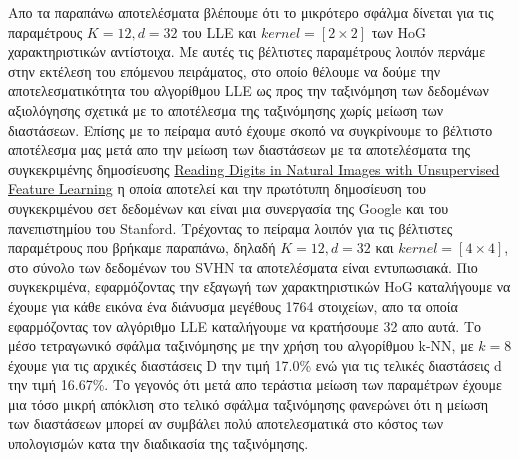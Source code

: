 \par
Απο τα παραπάνω αποτελέσματα βλέπουμε ότι το μικρότερο σφάλμα δίνεται για τις παραμέτρους $K=12, d=32$ του \textlatin{LLE} και $kernel=[2 \times 2]$ των \textlatin{HoG} χαρακτηριστικών αντίστοιχα. Με αυτές τις βέλτιστες παραμέτρους λοιπόν περνάμε στην εκτέλεση του επόμενου πειράματος, στο οποίο θέλουμε να δούμε την αποτελεσματικότητα του αλγορίθμου \textlatin{LLE} ως προς την ταξινόμηση των δεδομένων αξιολόγησης σχετικά με το αποτέλεσμα της ταξινόμησης χωρίς μείωση των διαστάσεων. Επίσης με το πείραμα αυτό έχουμε σκοπό να συγκρίνουμε το βέλτιστο αποτέλεσμα μας μετά απο την μείωση των διαστάσεων με τα αποτελέσματα της συγκεκριμένης δημοσίευσης \href{http://ufldl.stanford.edu/housenumbers/nips2011\textunderscore housenumbers.pdf}{\textlatin{Reading Digits in Natural Images
with Unsupervised Feature Learning}} η οποία αποτελεί και την πρωτότυπη δημοσίευση του συγκεκριμένου σετ δεδομένων και είναι μια συνεργασία της \textlatin{Google} και του πανεπιστημίου του \textlatin{Stanford}. Τρέχοντας το πείραμα λοιπόν για τις βέλτιστες παραμέτρους που βρήκαμε παραπάνω, δηλαδή $K=12, d=32$ και $kernel=[4 \times 4]$, στο σύνολο των δεδομένων του \textlatin{SVHN} τα αποτελέσματα είναι εντυπωσιακά. Πιο συγκεκριμένα, εφαρμόζοντας την εξαγωγή των χαρακτηριστικών \textlatin{HoG} καταλήγουμε να έχουμε για κάθε εικόνα ένα διάνυσμα μεγέθους 1764 στοιχείων, απο τα οποία εφαρμόζοντας τον αλγόριθμο \textlatin{LLE} καταλήγουμε να κρατήσουμε 32 απο αυτά. Το μέσο τετραγωνικό σφάλμα ταξινόμησης με την χρήση του αλγορίθμου \textlatin{k-NN}, με $k=8$ έχουμε για τις αρχικές διαστάσεις \textlatin{D} την τιμή 17.0\% ενώ για τις τελικές διαστάσεις \textlatin{d} την τιμή 16.67\%. Το γεγονός ότι μετά απο τεράστια μείωση των παραμέτρων έχουμε μια τόσο μικρή απόκλιση στο τελικό σφάλμα ταξινόμησης φανερώνει ότι η μείωση των διαστάσεων μπορεί αν συμβάλει πολύ αποτελεσματικά στο κόστος των υπολογισμών κατα την διαδικασία της ταξινόμησης.
\par
